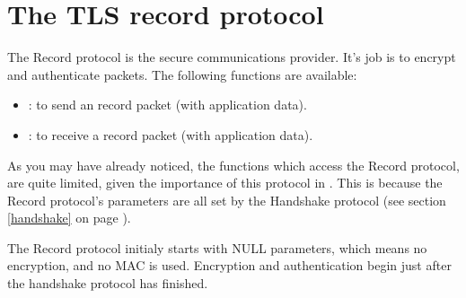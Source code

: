 \section{The TLS record protocol}

The Record protocol is the secure communications provider. It's job is
to encrypt and authenticate packets. 
The following functions are available:
\par
\begin{itemize}
\item {}:
to send an record packet (with application data).
\item {}:
to receive a record packet (with application data).
\end{itemize}

As you may have already noticed, the functions which access the Record protocol,
are quite limited, given the importance of this protocol in \tls{}.
This is because the Record protocol's parameters are all set by
the Handshake protocol (see section \ref{handshake} on page \pageref{handshake}).
\par
The Record protocol initialy starts with NULL parameters, which means
no encryption, and no MAC is used. Encryption and authentication begin
just after the handshake protocol has finished.



